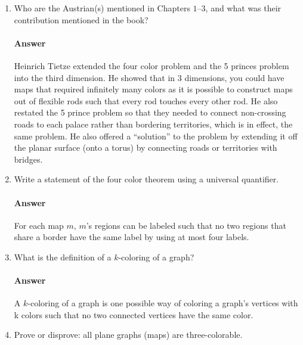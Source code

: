 \documentclass{article}
\begin{document}
\begin{enumerate}

    \item Who are the Austrian(s) mentioned in Chapters $1$--$3$, and what was their
        contribution mentioned in the book?

        \paragraph{Answer}
        Heinrich Tietze extended the four color problem and the 
        5 princes problem into the third dimension. He showed that in 3 dimensions, you 
        could have maps that required infinitely many colors as it is possible to construct 
        maps out of flexible rods such that every rod touches every other rod. He also restated
        the 5 prince problem so that they needed to connect non-crossing roads to each palace
        rather than bordering territories, which is in effect, the same problem. He also offered a
        ``solution'' to the problem by extending it off the planar surface (onto a torus) by 
        connecting roads or territories with bridges.

    \item Write a statement of the four color theorem using a universal
        quantifier.

        \paragraph{Answer}
        For each map $m$, $m$'s regions can be labeled such that no two regions that share a border have the same label by using at most four labels.

    \item What is the definition of a $k$-coloring of a graph?

        \paragraph{Answer}
        A $k$-coloring of a graph is one possible way of coloring a graph's vertices with k colors such that no two connected vertices have the same color.

    \item Prove or disprove: all plane graphs (maps) are three-colorable.


\end{enumerate}
\end{document}
